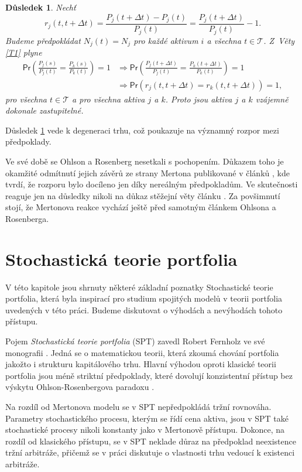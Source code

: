 \documentclass[a4paper,12pt]{report}
\newtheorem{dusledek}[veta]{Důsledek}
\theoremstyle{definition} \newtheorem{definice}[veta]{Definice}
\theoremstyle{remark}
\begin{document}
\begin{dusledek}\label{OR_dusledek}
Nechť 
$$r_j(t,t+\Delta t)=\frac{P_j(t+\Delta t)-P_j(t)}{P_j(t)}=\frac{P_j(t+\Delta t)}{P_j(t)}-1.$$
Budeme předpokládat $N_j(t)=N_j$ pro každé aktivum $i$ a všechna $t\in \mathcal{T}$. 
Z~Věty \ref{T1} plyne
\begin{align*}
\mathsf{Pr}\left(\frac{P_j(s)}{P_j(t)}=\frac{P_k(s)}{P_k(t)}\right)=1&\Longrightarrow\mathsf{Pr}\left(\frac{P_j(t+\Delta t)}{P_j(t)}=\frac{P_k(t+\Delta t)}{P_k(t)}\right)=1 \\
&\Longrightarrow\mathsf{Pr}\left(r_j(t,t+\Delta t)=r_k(t,t+\Delta t)\right)=1,
\end{align*}
pro všechna $t\in \mathcal{T}$ a pro všechna aktiva $j$ a $k$.
Proto jsou aktiva $j$ a $k$ vzájemně dokonale zastupitelné.
\end{dusledek}
Důsledek \ref{OR_dusledek} vede k degeneraci trhu, což poukazuje na významný rozpor mezi předpoklady.

Ve své době se Ohlson a Rosenberg nesetkali s pochopením.
Důkazem toho je okamžité odmítnutí jejich závěrů ze strany Mertona publikované v článků \cite{merton1975}, kde tvrdí, že rozporu bylo docíleno jen díky nereálným předpokladům. 
Ve skutečnosti reaguje jen na důsledky nikoli na důkaz stěžejní věty článku \cite{ohlson}.  
Za povšimnutí stojí, že Mertonova reakce vychází ještě před samotným článkem Ohlsona a Rosenberga.


\section{Stochastická teorie portfolia}
V této kapitole jsou shrnuty některé základní poznatky Stochastické teorie portfolia, která byla inspirací pro studium spojitých modelů v teorii portfolia uvedených v této práci.
Budeme diskutovat o výhodách a nevýhodách tohoto přístupu.

Pojem \textit{Stochastická teorie portfolia} (SPT) zavedl Robert Fernholz ve své monografii \cite{fern}.
Jedná se o matematickou teorii, která zkoumá chování portfolia jakožto i strukturu kapitálového trhu.
Hlavní výhodou oproti klasické teorii portfolia jsou méně  striktní předpoklady, které dovolují konzistentní přístup bez výskytu Ohlson-Rosenbergova paradoxu \cite{ohlson}.

Na rozdíl od Mertonova modelu se v SPT nepředpokládá tržní rovnováha.
Parametry stochastického procesu, kterým se řídí cena aktiva, jsou v SPT také stochastické procesy nikoli konstanty jako v Mertonově přístupu.
Dokonce, na rozdíl od klasického přístupu, se v SPT neklade důraz na předpoklad neexistence tržní arbitráže, přičemž se v práci diskutuje o vlastnosti trhu vedoucí k existenci arbitráže. 
\end{document}
